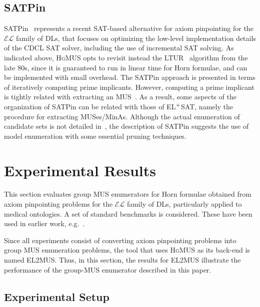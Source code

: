 \documentclass{llncs}
\newcommand{\tn}{\textnormal}
\newcommand{\fml}[1]{{\mathcal{#1}}}
\newcommand{\elplain}{$\fml{EL}$\xspace}
\newcommand{\hgmus}{\textsc{HgMUS}\xspace}
\newcommand{\elsat}{EL$^{\tn{+}}$SAT\xspace}
\begin{document}
\subsection{SATPin}

SATPin~\cite{mp-tr15} represents a recent SAT-based alternative for
axiom pinpointing for the \elplain family of DLs, that focuses on
optimizing the low-level implementation details of the CDCL SAT
solver, including the use of incremental SAT solving. As indicated
above, \hgmus opts to revisit instead the LTUR~\cite{minoux-ipl88}
algorithm from the late 80s, since it is guaranteed to run in linear
time for Horn formulae, and can be implemented with small overhead.
The SATPin approach is presented in terms of iteratively computing
prime implicants. However, computing a prime implicant is tightly
related with extracting an MUS~\cite{bradley-fmcad07}. As a result,
some aspects of the organization of SATPin can be related with those
of \elsat, namely the procedure for extracting MUSes/MinAs.
Although the actual enumeration of candidate sets is not detailed
in~\cite{mp-tr15}, the description of SATPin suggests the use of model
enumeration with some essential pruning techniques.


\section{Experimental Results} \label{sec:res}

This section evaluates group MUS enumerators for Horn formulae
obtained from axiom pinpointing problems for the \elplain family of
DLs, particularly applied to medical ontologies. 
A set of standard benchmarks is considered. These have been used in
earlier
work,
e.g.~\cite{baader-ijcar06,sebastiani-cade09,ludwig-ore14,ams-corr15,mp-tr15}.

Since all experiments consist of converting axiom pinpointing problems
into group MUS enumeration problems, the tool that uses \hgmus as its
back-end is named EL2MUS. Thus, in this section, the results for
EL2MUS illustrate the performance of the group-MUS enumerator
described in this paper.


\subsection{Experimental Setup}
\end{document}
